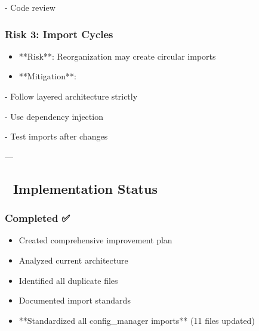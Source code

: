\documentclass[11pt,a4paper]{article}
\begin{document}
  - Code review

\subsubsection{Risk 3: Import Cycles}

\begin{itemize}
\item **Risk**: Reorganization may create circular imports
\end{itemize}

\begin{itemize}
\item **Mitigation**:
\end{itemize}

  - Follow layered architecture strictly

  - Use dependency injection

  - Test imports after changes

---

\subsection{🚀 Implementation Status}

\subsubsection{Completed ✅}

\begin{itemize}
\item [x] Created comprehensive improvement plan
\end{itemize}

\begin{itemize}
\item [x] Analyzed current architecture
\end{itemize}

\begin{itemize}
\item [x] Identified all duplicate files
\end{itemize}

\begin{itemize}
\item [x] Documented import standards
\end{itemize}

\begin{itemize}
\item [x] **Standardized all config_manager imports** (11 files updated)
\end{itemize}
\end{document}
